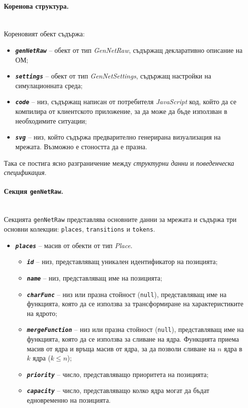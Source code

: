 \paragraph{Коренова структура.}\mbox{}\\
Кореновият обект съдържа:
\begin{itemize}
\item \texttt{\textbf{\textit{genNetRaw}}} -- обект от тип \textit{GenNetRaw}, съдържащ декларативно описание на ОМ;
\item \texttt{\textbf{\textit{settings}}} -- обект от тип \textit{GenNetSettings}, съдържащ настройки на симулационната среда;
\item \texttt{\textbf{\textit{code}}} -- низ, съдържащ написан от потребителя \textit{JavaScript} код, който да се компилира от клиентското приложение, за да може да бъде използван в необходимите ситуации;
\item \texttt{\textbf{\textit{svg}}} -- низ, който съдържа предварително генерирана визуализация на мрежата. Възможно е стоността да е празна.
\end{itemize}
Така се постига ясно разграничение между \emph{структурни данни} и \emph{поведенческа спецификация}.

\paragraph{Секция \texttt{genNetRaw}.}\mbox{}\\
Секцията \texttt{genNetRaw} представлява основните данни за мрежата и съдържа три основни колекции: \texttt{places}, \texttt{transitions} и \texttt{tokens}.

\begin{itemize}
\item \texttt{\textbf{\textit{places}}} -- масив от обекти от тип \textit{Place}.
\begin{itemize}
\item \texttt{\textbf{\textit{id}}} -- низ, представляващ уникален идентификатор на позицията;
\item \texttt{\textbf{\textit{name}}} -- низ, представляващ име на позицията;
\item \texttt{\textbf{\textit{charFunc}}} -- низ или празна стойност (\texttt{null}), представляващ име на функцията, която да се използва за трансформиране на характеристиките на ядрото;
\item \texttt{\textbf{\textit{mergeFunction}}} -- низ или празна стойност (\texttt{null}), представляващ име на функцията, която да се използва за сливане на ядра. Функцията приема масив от ядра и връща масив от ядра, за да позволи сливане на $n$ ядра в $k$ ядра ($k \leq n$);
\item \texttt{\textbf{\textit{priority}}} -- число, представляващо приоритета на позицията;
\item \texttt{\textbf{\textit{capacity}}} -- число, представляващо колко ядра могат да бъдат едновременно на позицията.
\end{itemize}
\end{itemize}

